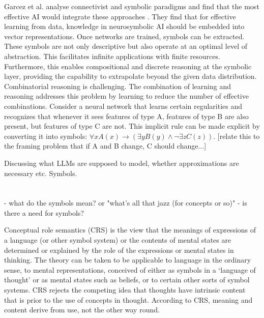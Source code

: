 Garcez et al. analyse connectivist and symbolic paradigms and find that the most effective AI would integrate these approaches \cite{garcez2020neurosymbolic}. They find that for effective learning from data, knowledge in neurosymbolic AI should be embedded into vector representations. Once networks are trained, symbols can be extracted. These symbols are not only descriptive but also operate at an optimal level of abstraction. This facilitates infinite applications with finite resources. Furthermore, this enables compositional and discrete reasoning at the symbolic layer, providing the capability to extrapolate beyond the given data distribution. Combinatorial reasoning is challenging. The combination of learning and reasoning addresses this problem by learning to reduce the number of effective combinations. 
Consider a neural network that learns certain regularities and recognizes that whenever it sees features of type A, features of type B are also present, but features of type C are not. This implicit rule can be made explicit by converting it into symbols: $\forall x A(x) \rightarrow (\exists y B(y) \land \lnot \exists z C(z))$.
[relate this to the framing problem that if A and B change, C should change...]


Discussing what LLMs are supposed to model, whether approximations are necessary etc. Symbols. \cite{Blank_2023}

\subsubsection{}



\section{}
- what do the symbols mean? or "what's all that jazz (for concepts or so)"
- is there a need for symbols?

Conceptual role semantics (CRS) is the view that the meanings of expressions of a language (or other symbol system) or the contents of mental states are determined or explained by the role of the expressions or mental states in thinking. The theory can be taken to be applicable to language in the ordinary sense, to mental representations, conceived of either as symbols in a ‘language of thought’ or as mental states such as beliefs, or to certain other sorts of symbol systems. CRS rejects the competing idea that thoughts have intrinsic content that is prior to the use of concepts in thought. According to CRS, meaning and content derive from use, not the other way round.

